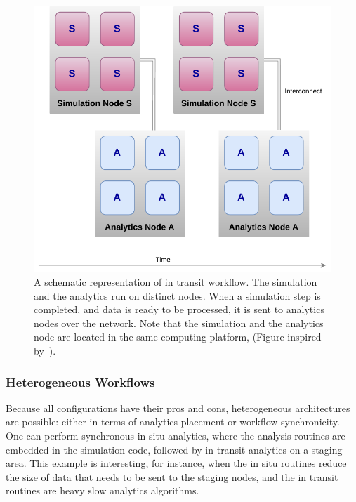 \begin{figure}[tb]\centering
\includegraphics[scale=0.8]{figures/intransit.pdf}
\caption{A schematic representation of in transit workflow. The simulation and the analytics run on distinct nodes. When a simulation step is completed, and data is ready to be processed, it is sent to analytics nodes over the network. Note that the simulation and the analytics node are located in the same computing platform, (Figure inspired by~\cite{Estelle_integration_2018}).}
\label{figintransit}
\end{figure}

\subsubsection{Heterogeneous Workflows}
Because all configurations have their pros and cons, heterogeneous architectures are possible: either in terms of analytics placement or workflow synchronicity. One can perform synchronous in situ analytics, where the analysis routines are embedded in the simulation code, followed by in transit analytics on a staging area. This example is interesting, for instance, when the in situ routines reduce the size of data that needs to be sent to the staging nodes, and the in transit routines are heavy slow analytics algorithms.  

